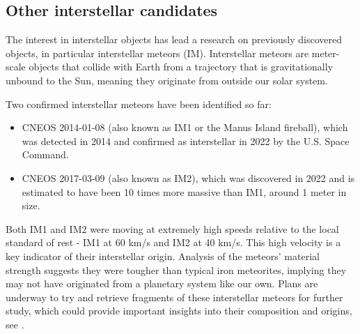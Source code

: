 \subsection{Other interstellar candidates}

The interest in interstellar objects has lead a research on previously
discovered objects, in particular interstellar meteors (IM). Interstellar
meteors are meter-scale objects that collide with Earth from a trajectory that
is gravitationally unbound to the Sun, meaning they originate from outside our
solar system.

Two confirmed interstellar meteors have been identified so far:

\begin{itemize}
  \item CNEOS 2014-01-08 (also known as IM1 or the Manus Island fireball), which
        was detected in 2014 and confirmed as interstellar in 2022 by the U.S. Space
        Command.
  \item CNEOS 2017-03-09 (also known as IM2), which was discovered in 2022 and is
        estimated to have been 10 times more massive than IM1, around 1 meter in
        size.
\end{itemize}

Both IM1 and IM2 were moving at extremely high speeds relative to the local
standard of rest - IM1 at 60 km/s and IM2 at 40 km/s. This high velocity is a
key indicator of their interstellar origin. Analysis of the meteors' material
strength suggests they were tougher than typical iron meteorites, implying they
may not have originated from a planetary system like our own. Plans are underway
to try and retrieve fragments of these interstellar meteors for further study,
which could provide important insights into their composition and origins, see
\cite{siraj2022discovery}.
